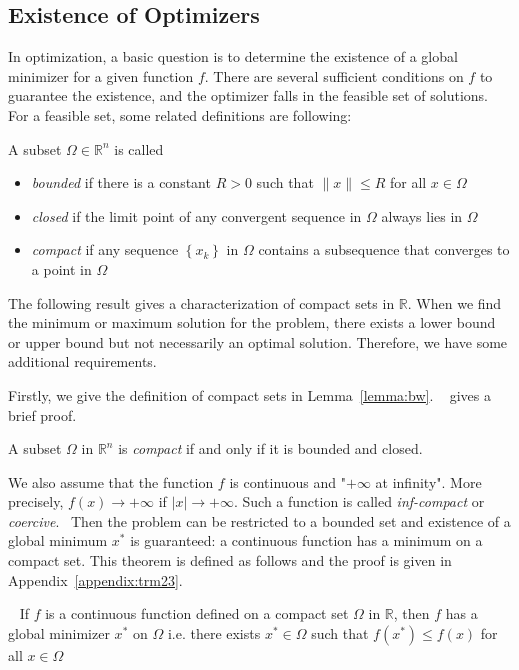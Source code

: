 \subsection{Existence of Optimizers}
In optimization, a basic question is to determine the existence of a global minimizer for a given function $f$. There are several sufficient conditions on $f$ to guarantee the existence, and the optimizer falls in the feasible set of solutions. For a feasible set, some related definitions are following: 
\begin{defn}
    A subset $\Omega \in \mathbb{R}^n$ is called
    \begin{itemize}
        \item \emph{bounded} if there is a constant $R > 0$ such that $\|x\| \leq R$ for all $x \in \Omega$
        \item \emph{closed} if the limit point of any convergent sequence in $\Omega$ always lies in $\Omega$
        \item \emph{compact} if any sequence $\left\{x_{k}\right\}$ in $\Omega$ contains a subsequence that converges to a point in $\Omega$
    \end{itemize}
\end{defn}
\par The following result gives a characterization of compact sets in $\mathbb{R}$. When we find the minimum or maximum solution for the problem, there exists a lower bound or upper bound but not necessarily an optimal solution. Therefore, we have some additional requirements. 
\par Firstly, we give the definition of compact sets in Lemma~\ref{lemma:bw}. ~\citep{OG:17} gives a brief proof.
\begin{lemma}
    \label{lemma:bw}
    A subset $\Omega$ in $\mathbb{R}^n$ is \emph{compact} if and only if it is bounded and closed.
\end{lemma}
\par We also assume that the function $f$ is continuous and "$+\infty$ at infinity". More precisely, $f(x) \rightarrow+\infty$ if $|x| \rightarrow+\infty$. Such a function is called \emph{inf-compact} or \emph{coercive}.~\citep{JS:06} Then the problem can be restricted to a bounded set and existence of a global minimum $x^{*}$ is guaranteed: a continuous function has a minimum on a compact set. This theorem is defined as follows and the proof is given in Appendix~\ref{appendix:trm23}.
\begin{thm}~\citep{JS:06}
    \label{thm:23}
    If $f$ is a continuous function defined on a compact set $\Omega$ in $\mathbb{R}$, then $f$ has a global minimizer $x^{*}$ on $\Omega$ i.e. there exists $x^{*} \in \Omega$ such that $f\left(x^{*}\right) \leq f(x)$ for all $x \in \Omega$
\end{thm}
